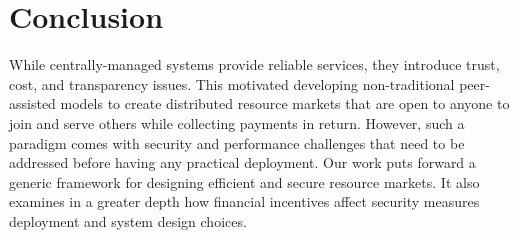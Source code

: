 \documentclass{llncs}
\begin{document}
\section{Conclusion}
While centrally-managed systems provide reliable services, they introduce trust, cost, and transparency issues. This motivated developing non-traditional peer-assisted models to create distributed resource markets that are open to anyone to join and serve others while collecting payments in return. However, such a paradigm comes with security and performance challenges that need to be addressed before having any practical deployment. Our work puts forward a generic framework for designing efficient and secure resource markets. It also examines in a greater depth how financial incentives affect security measures deployment and system design choices.


{\footnotesize \vspace{-6pt}

}

\normalsize

\end{document}
